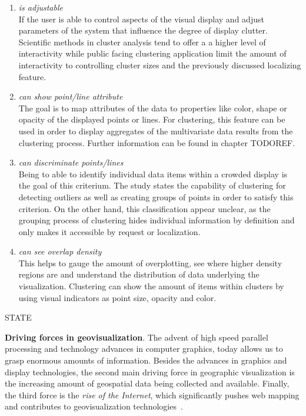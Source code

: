 \begin{enumerate}
\item \textit{is adjustable}
\\ If the user is able to control aspects of the visual display and adjust parameters of the system that influence the degree of display clutter. Scientific methods in cluster analysis tend to offer a a higher level of interactivity while public facing clustering application limit the amount of interactivity to controlling cluster sizes and the previously discussed localizing feature. 

\item \textit{can show point/line attribute}
\\ The goal is to map attributes of the data to properties like color, shape or opacity of the displayed points or lines. For clustering, this feature can be used in order to display aggregates of the multivariate data results from the clustering process. Further information can be found in chapter TODOREF.

\item \textit{can discriminate points/lines}
\\ Being to able to identify individual data items within a crowded display is the goal of this criterium. The study states the capability of clustering for detecting outliers as well as creating groups of points in order to satisfy this criterion. On the other hand, this classification appear unclear, as the grouping process of clustering hides individual information by definition and only makes it accessible by request or localization. 

\item \textit{can see overlap density}
\\ This helps to gauge the amount of overplotting, see where higher density regions are and understand the distribution of data underlying the visualization. Clustering can show the amount of items within clusters by using visual indicators as point size, opacity and color.  

\end{enumerate}


STATE

\textbf{Driving forces in geovisualization}. The advent of high speed parallel processing and technology advances in computer graphics, today allows us to grasp enormous amounts of information. Besides the advances in graphics and display technologies, the second main driving force in geographic visualization is the increasing amount of geospatial data being collected and available. Finally, the third force is the \textit{rise of the Internet}, which significantly pushes web mapping and contributes to geovisualization technologies~\cite{noellenburg11geovis, vislecture}.

